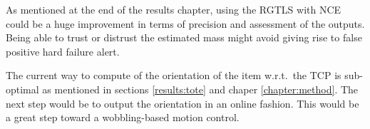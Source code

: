 \documentclass[/home/francois/latex/report/main.tex]{subfiles}
\begin{document}
As mentioned at the end of the results chapter, using the \ac{RGTLS} with \ac{NCE} could be a huge improvement in terms of precision and assessment of the outputs. Being able to trust or distrust the estimated mass might avoid giving rise to false positive hard failure alert.

The current way to compute of the orientation of the item w.r.t.\ the \ac{TCP} is sub-optimal as mentioned in sections \ref{results:tote} and chaper \ref{chapter:method}. The next step would be to output the orientation in an online fashion. This would be a great step toward a wobbling-based motion control.
\end{document}
